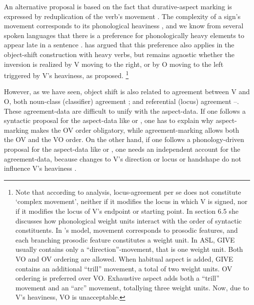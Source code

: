 \documentclass[output=paper,colorlinks,citecolor=brown,
]{langscibook}
\begin{document}
An alternative proposal is based on the fact that durative-aspect
marking is expressed by reduplication of the verb’s movement 
\citep{Klima.Bellugi.1979}. The complexity of a sign’s movement corresponds to
its phonological heaviness \citep{Brentari.1998}, and we know from several
spoken languages that there is a preference for phonologically heavy
elements to appear late in a sentence .
\citet{Brentari.1998} has argued that this preference also applies in the
object-shift construction with heavy verbs, but remains agnostic
whether the inversion is realized by V moving to the right, or by O
moving to the left triggered by V’s heaviness, as \citet{Liddell.1980}
proposed.%
\footnote{
    Note that according to  analysis, locus-agreement per se
    does not constitute `complex movement', neither if it modifies the locus in which V
    is signed, nor if it modifies the locus of V’s endpoint or starting point. In section 6.5
    she discusses how phonological weight units interact with the order of syntactic
    constituents. In \citeauthor{Brentari.1998}’s model, movement corresponds to prosodic features, and
    each branching prosodic feature constitutes a weight unit. In ASL, GIVE usually
    contains only a “direction”-movement, that is one weight unit. Both VO and OV
    ordering are allowed. When habitual aspect is added, GIVE contains an additional
    “trill” movement, a total of two weight units. OV ordering is preferred over VO.
    Exhaustive aspect adds both a “trill” movement and an “arc” movement, totallying
    three weight units. Now, due to V’s heaviness, VO is unacceptable.
}

However, as we have seen, object shift is also related to
agreement between V and O, both noun-class (classifier) agreement
; and referential (locus) agreement --. 
These agreement-data
are difficult to unify with the aspect-data. If one follows a syntactic
proposal for the aspect-data like \citet{Matsuoka.1997} or \citet{Braze.2004},
one has to explain why aspect-marking makes the OV order
obligatory, while agreement-marking allows both the OV and the VO
order. On the other hand, if one follows a phonology-driven proposal
for the aspect-data like \citet{Liddell.1980} or \citet{Brentari.1998}, one needs an
independent account for the agreement-data, because changes to V’s
direction or locus or handshape do not influence V’s heaviness
\citep{Brentari.1998}.
\end{document}
